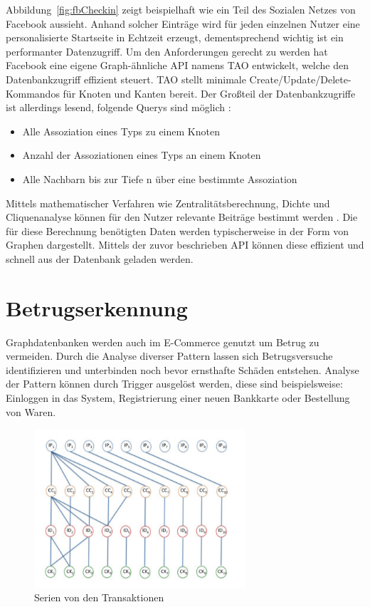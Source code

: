 Abbildung~\ref{fig:fbCheckin} zeigt beispielhaft wie ein Teil des Sozialen Netzes von Facebook aussieht. Anhand solcher Einträge wird für jeden einzelnen Nutzer eine personalisierte Startseite in Echtzeit erzeugt, dementsprechend wichtig ist ein performanter Datenzugriff. Um den Anforderungen gerecht zu werden hat Facebook eine eigene Graph-ähnliche API namens TAO entwickelt, welche den Datenbankzugriff effizient steuert. TAO stellt minimale Create/Update/Delete-Kommandos für Knoten und Kanten bereit. Der Großteil der Datenbankzugriffe ist allerdings lesend, folgende Querys sind möglich \cite{facebookTao}:
\begin{itemize}
	\item Alle Assoziation eines Typs zu einem Knoten
	\item Anzahl der Assoziationen eines Typs an einem Knoten
	\item Alle Nachbarn bis zur Tiefe n über eine bestimmte Assoziation
\end{itemize}

Mittels mathematischer Verfahren wie Zentralitätsberechnung, Dichte und Cliquenanalyse können für den Nutzer relevante Beiträge bestimmt werden \cite{sozialeNetzwerkanalyse}. Die für diese Berechnung benötigten Daten werden typischerweise in der Form von Graphen dargestellt. Mittels der zuvor beschrieben API können diese effizient und schnell aus der Datenbank geladen werden.


\section{Betrugserkennung}
Graphdatenbanken werden auch im E-Commerce genutzt um Betrug zu vermeiden. Durch die Analyse diverser Pattern lassen sich Betrugsversuche identifizieren und unterbinden noch bevor ernsthafte Schäden entstehen. Analyse der Pattern können durch Trigger ausgelöst werden, diese sind beispielsweise: Einloggen in das System, Registrierung einer neuen Bankkarte oder Bestellung von Waren.

\begin{figure}[h]
	\caption{Serien von den Transaktionen \cite{Betrugserkennung}}
	\label{fig:Trs}
	\centering
	\includegraphics[width=0.7\textwidth]{images/Betrugserkennung.png}
\end{figure}

